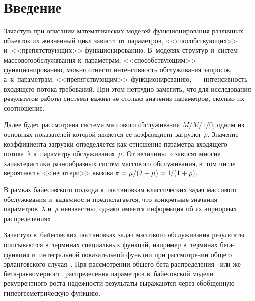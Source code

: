 

\vspace*{-9pt}



\thispagestyle{headings}

\begin{multicols}{2}

\label{st\stat}

\section{Введение}

Зачастую при описании математических мо\-де\-лей функционирования различных объектов 
их жизненный цикл зависит от параметров, <<способствующих>> и~<<препятствующих>> 
функционированию. В~моделях структур и~систем массового\linebreak обслуживания к~параметрам, 
<<способствующим>> функционированию, можно отнести интенсивность обслуживания 
запросов, а~к~параметрам, <<препятствующим>> функционированию,~--- 
интенсивность входящего потока требований. При этом нетрудно заметить, 
что для исследования результатов работы системы важны не столько значения 
параметров, сколько их соотношение.

Далее будет рассмотрена система массового обслужи\-вания $M/M/1/0$, одним из 
основных показателей которой является ее коэффициент загрузки~$\rho$. 
Значение коэффициента загрузки определяется как отношение параметра входящего 
потока~$\lambda$ к~па\-ра\-мет\-ру обслуживания~$\mu$. От величины~$\rho$ 
зависят многие характеристики разнообразных систем массового обслуживания, в~том 
числе вероятность <<непотери>> вызова $\pi \hm= {\mu/(\lambda \hm+ \mu)}
\hm = 1/(1\hm+\rho)$.

В рамках байесовского подхода к~постановкам классических задач массового 
обслуживания и~надежности предполагается, что конкретные значения параметров~$\lambda$ 
и~$\mu$ неизвестны, однако имеется информация об их априорных распределениях~\cite{KuSh2015}.

Зачастую в~байесовских постановках задач массового обслуживания результаты 
описываются в~терминах специальных функций, например в~терминах бе\-та-функ\-ции 
и~интегральной показательной функции при рассмотрении общего эрланговского 
случая~\cite{KuSh09b}. При рассмотрении общего 
бе\-та-рас\-пре\-де\-ле\-ния~\cite{ZhaKuSh} или же бе\-та-рав\-но\-мер\-но\-го~\cite{ZhaKuSh2} 
распределения параметров в~байесовской модели рекуррентного роста надежности 
результаты выражаются через обобщенную гипергеометрическую функцию.


\end{multicols}
